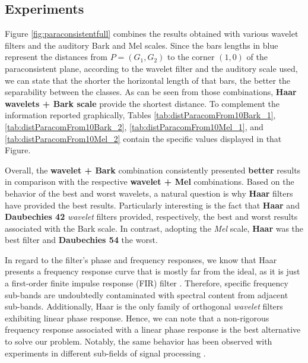 \subsection{Experiments}
\par Figure \ref{fig:paraconsistentfull} combines the results obtained with various wavelet filters and the auditory Bark and Mel scales. Since the bars lengths in blue represent the distances from $P=(G_1,G_2)$ to the corner $(1,0)$ of the paraconsistent plane, according to the wavelet filter and the auditory scale used, we can state that the shorter the horizontal length of that bars, the better the separability between the classes. As can be seen from those combinations, \textbf{Haar wavelets + Bark scale} provide the shortest distance. To complement the information reported graphically, Tables \ref{tab:distParacomFrom10Bark_1}, \ref{tab:distParacomFrom10Bark_2}, \ref{tab:distParacomFrom10Mel_1}, and \ref{tab:distParacomFrom10Mel_2} contain the specific values displayed in that Figure.
\\
\par Overall, the \textbf{wavelet + Bark} combination consistently presented \textbf{better} results in comparison with the respective \textbf{wavelet + Mel} combinations. Based on the behavior of the best and worst wavelets, a natural question is why \textbf{Haar} filters have provided the best results. Particularly interesting is the fact that \textbf{Haar} and \textbf{Daubechies 42} \textit{wavelet} filters provided, respectively, the best and worst results associated with the Bark scale. In contrast, adopting the \textit{Mel} scale, \textbf{Haar} was the best filter and \textbf{Daubechies 54} the worst.
\\
\par In regard to the filter's phase and frequency responses, we know that Haar presents a frequency response curve that is mostly far from the ideal, as it is just a first-order finite impulse response (FIR) filter \cite{WaveletPropertiesBrowser}. Therefore, specific frequency sub-bands are undoubtedly contaminated with spectral content from adjacent sub-bands. Additionally, Haar is the only family of orthogonal \textit{wavelet} filters exhibiting linear phase response. Hence, we can note that a non-rigorous frequency response associated with a linear phase response is the best alternative to solve our problem. Notably, the same behavior has been observed with experiments in different sub-fields of signal processing \cite{guido2}\cite{guido3}\cite{guido4}. 
\\
